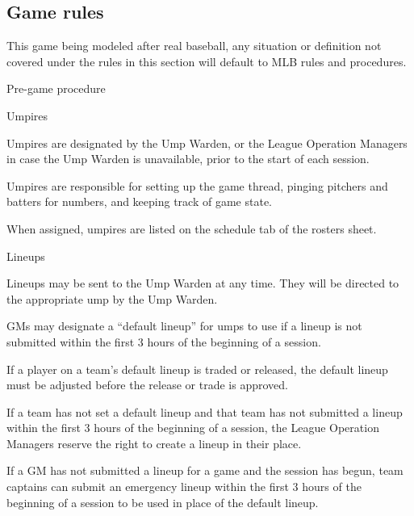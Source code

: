
\subsection{Game rules}
\label{sec:game rules}
\begin{deepEnumerate}
	\item This game being modeled after real baseball, any situation or definition not covered under the rules in this section will default to MLB rules and procedures.
	\item Pre-game procedure
	\begin{deepEnumerate}
		\item Umpires 
		\begin{deepEnumerate}
			\item Umpires are designated by the Ump Warden, or the League Operation Managers in case the Ump Warden is unavailable, prior to the start of each session.
			\item Umpires are responsible for setting up the game thread, pinging pitchers and batters for numbers, and	keeping track of game state.
			\item When assigned, umpires are listed on the schedule tab of the rosters sheet.
		\end{deepEnumerate}
		\label{sec:lineups}
		\item Lineups
		\begin{deepEnumerate}
			\item Lineups may be sent to the Ump Warden at any time. They will be directed to the appropriate ump by the Ump Warden.
			\item GMs may designate a “default lineup” for umps to use if a lineup is not submitted within the first 3 hours of the beginning of a session.
			\begin{deepEnumerate}
				\item If a player on a team’s default lineup is traded or released, the default lineup must be adjusted before the release or trade is approved.
				\item If a team has not set a default lineup and that team has not submitted a lineup within the first 3 hours of the beginning of a session, the League
				Operation Managers reserve the right to create a lineup in their place.
				\item If a GM has not submitted a lineup for a game and the session has begun, 
				\label{sec:captain lineups}
				team captains can submit an emergency lineup within the first 3 hours of the beginning of a session to be used in place of the default lineup.

\end{deepEnumerate}
\end{deepEnumerate}
\end{deepEnumerate}
\end{deepEnumerate}
